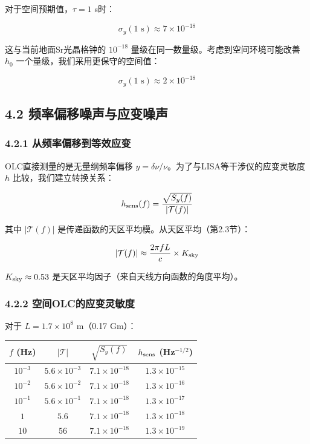 \documentclass[12pt,a4paper]{article}
\begin{document}
对于空间预期值，$\tau = 1$ s时：

$$\sigma_y(1\text{ s}) \approx 7 \times 10^{-18}$$

这与当前地面Sr光晶格钟的 $10^{-18}$ 量级在同一数量级。考虑到空间环境可能改善 $h_0$ 一个量级，我们采用更保守的空间值：

$$\sigma_y(1\text{ s}) \approx 2 \times 10^{-18}$$

\subsection{4.2 频率偏移噪声与应变噪声}


\subsubsection{4.2.1 从频率偏移到等效应变}


OLC直接测量的是无量纲频率偏移 $y = \delta\nu/\nu$。为了与LISA等干涉仪的应变灵敏度 $h$ 比较，我们建立转换关系：

$$h_{\rm sens}(f) = \frac{\sqrt{S_y(f)}}{|\mathcal{T}(f)|}$$

其中 $|\mathcal{T}(f)|$ 是传递函数的天区平均模。从天区平均（第2.3节）：

$$|\mathcal{T}(f)| \approx \frac{2\pi f L}{c} \times K_{\rm sky}$$

$K_{\rm sky} \approx 0.53$ 是天区平均因子（来自天线方向函数的角度平均）。

\subsubsection{4.2.2 空间OLC的应变灵敏度}


对于 $L = 1.7 \times 10^8$ m（0.17 Gm）：

\begin{tabular}{|c|c|c|c|}
\hline
$f$ (Hz) & $|\mathcal{T}|$ & $\sqrt{S_y(f)}$ & $h_{\rm sens}$ (Hz$^{-1/2}$) \\
\hline
$10^{-3}$ & $5.6 \times 10^{-3}$ & $7.1 \times 10^{-18}$ & $1.3 \times 10^{-15}$ \\
$10^{-2}$ & $5.6 \times 10^{-2}$ & $7.1 \times 10^{-18}$ & $1.3 \times 10^{-16}$ \\
$10^{-1}$ & $5.6 \times 10^{-1}$ & $7.1 \times 10^{-18}$ & $1.3 \times 10^{-17}$ \\
$1$ & $5.6$ & $7.1 \times 10^{-18}$ & $1.3 \times 10^{-18}$ \\
$10$ & $56$ & $7.1 \times 10^{-18}$ & $1.3 \times 10^{-19}$ \\
\hline
\end{tabular}
\end{document}

